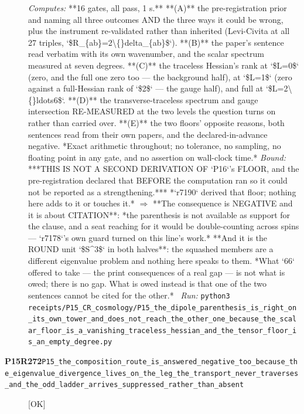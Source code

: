 \begin{description}
\emph{Computes:} **16 gates, all pass, 1 s.** **(A)** the pre-registration prior and naming all three outcomes AND the three ways it could be wrong, plus the instrument re-validated rather than inherited (Levi-Civita at all 27 triples, `\$R\_\{ab\}=2\textbackslash\{\}delta\_\{ab\}\$`). **(B)** the paper's sentence read verbatim with its own wavenumber, and the scalar spectrum measured at seven degrees. **(C)** the traceless Hessian's rank at `\$L=0\$` (zero, and the full one zero too --- the background half), at `\$L=1\$` (zero against a full-Hessian rank of `\$2\$` --- the gauge half), and full at `\$L=2\textbackslash\{\}ldots6\$`. **(D)** the transverse-traceless spectrum and gauge intersection RE-MEASURED at the two levels the question turns on rather than carried over. **(E)** the two floors' opposite reasons, both sentences read from their own papers, and the declared-in-advance negative. *Exact arithmetic throughout; no tolerance, no sampling, no floating point in any gate, and no assertion on wall-clock time.*
 \emph{Bound:}  ***THIS IS NOT A SECOND DERIVATION OF `P16`'s FLOOR, and the pre-registration declared that BEFORE the computation ran so it could not be reported as a strengthening.*** *`r7190` derived that floor; nothing here adds to it or touches it.* \ensuremath{\Rightarrow} **The consequence is NEGATIVE and it is about CITATION**: *the parenthesis is not available as support for the clause, and a seat reaching for it would be double-counting across spins --- `r7178`'s own guard turned on this line's work.*  **And it is the ROUND unit `\$S\textasciicircum{}3\$` in both halves**: the squashed members are a different eigenvalue problem and nothing here speaks to them.  *What `66` offered to take --- the print consequences of a real gap --- is not what is owed; there is no gap. What is owed instead is that one of the two sentences cannot be cited for the other.*
\ \emph{Run:} \texttt{python3 receipts/P15\_CR\_cosmology/P15\_the\_dipole\_parenthesis\_is\_right\_on\_its\_own\_tower\_and\_does\_not\_reach\_the\_other\_one\_because\_the\_scalar\_floor\_is\_a\_vanishing\_traceless\_hessian\_and\_the\_tensor\_floor\_is\_an\_empty\_degree.py}
\item[\rcptlabel{P15_the_composition_route_is_answered_negative_too_because_the_eigenvalue_divergence_lives_on_the_leg_the_transport_never_traverses_and_the_odd_ladder_arrives_suppressed_rather_than_absent}{P15R272}\textbf{P15R272}\quad\texttt{P15\_the\_composition\_route\_is\_answered\_negative\_too\_because\_the\_eigenvalue\_divergence\_lives\_on\_the\_leg\_the\_transport\_never\_traverses\_and\_the\_odd\_ladder\_arrives\_suppressed\_rather\_than\_absent}]\hfill\textsf{[OK]}\\

\end{description}
